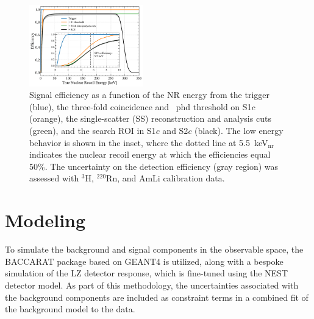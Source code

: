 \documentclass[reprint, showpacs,
preprintnumbers,
amsmath,amssymb,
aps, floatfix,
superscriptaddress,
prd, nofootinbib]{revtex4-1}
\begin{document}
\begin{figure}[t]
    \centering
    \includegraphics[trim={5 5 5 5},clip, width=0.44\textwidth]{FlatNR_efficiencies_NoSkew_ERTune}
\caption{Signal efficiency as a function of the NR energy from the trigger (blue), the three-fold coincidence and ~phd threshold on S1$c$ (orange), the single-scatter (SS) reconstruction and analysis cuts (green), and the search ROI in S1$c$ and S2$c$ (black). 
The low energy behavior is shown in the inset, where the dotted line at 5.5~keV$_{\text{nr}}$ indicates the nuclear recoil energy at which the efficiencies equal 50\%.
The uncertainty on the detection efficiency (gray region) was assessed with ${}^3$H, ${}^{220}$Rn, and AmLi calibration data. 
}
    \label{fig:acceptances}
\end{figure}


\section{\label{sec:model_and_stats}Modeling}
To simulate the background and signal components in the observable space, the BACCARAT package based on GEANT4 \cite{LZ:simulations_2021, ALLISON2016} is utilized, along with a bespoke simulation of the LZ detector response, which is fine-tuned using the NEST detector model. 
As part of this methodology, the uncertainties associated with the background components are included as constraint terms in a combined fit of the background model to the data.
\end{document}
